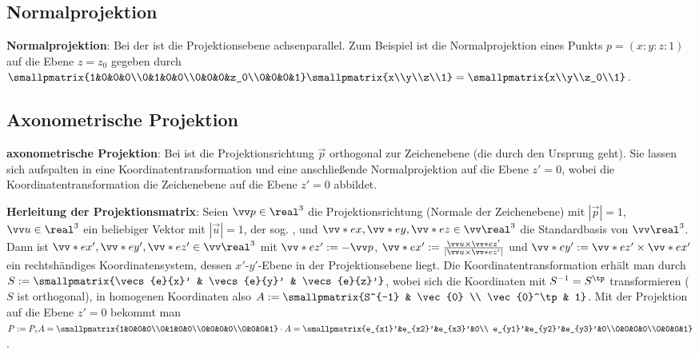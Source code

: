 \subsection{%
    Normalprojektion%
}

\textbf{Normalprojektion}:
Bei der  ist die Projektionsebene achsenparallel.
Zum Beispiel ist die Normalprojektion eines Punkts $p = (x:y:z:1)$ auf die Ebene $z = z_0$
gegeben durch
$\smallpmatrix{1&0&0&0\\0&1&0&0\\0&0&0&z_0\\0&0&0&1} \smallpmatrix{x\\y\\z\\1} =
\smallpmatrix{x\\y\\z_0\\1}$.

\subsection{%
    Axonometrische Projektion%
}

\textbf{axonometrische Projektion}:
Bei  ist die Projektionsrichtung $\vec{p}$ orthogonal
zur Zeichenebene (die durch den Ursprung geht).
Sie lassen sich aufspalten in eine Koordinatentransformation und eine anschließende
Normalprojektion auf die Ebene $z' = 0$,
wobei die Koordinatentransformation die Zeichenebene auf die Ebene $z' = 0$ abbildet.

\textbf{Herleitung der Projektionsmatrix}:
Seien $\vec{p} \in \real^3$ die Projektionsrichtung (Normale der Zeichenebene) mit $|\vec{p}| = 1$,
$\vec{u} \in \real^3$ ein beliebiger Vektor mit $|\vec{u}| = 1$, der sog. ,
und $\vecs{e}{x}, \vecs{e}{y}, \vecs{e}{z} \in \vec{\real}^3$ die Standardbasis von
$\vec{\real}^3$.
Dann ist $\vecs{e}{x}', \vecs{e}{y}', \vecs{e}{z}' \in \vec{\real}^3$
mit $\vecs{e}{z}' := -\vec{p}$,
$\vecs{e}{x}' := \frac{\vec{u} \times \vecs{e}{z}'}{|\vec{u} \times \vecs{e}{z}'|}$ und
$\vecs{e}{y}' := \vecs{e}{z}' \times \vecs{e}{x}'$
ein rechtshändiges Koordinatensystem, dessen $x'$-$y'$-Ebene in der Projektionsebene liegt.
Die Koordinatentransformation erhält man durch
$S := \smallpmatrix{\vecs{e}{x}' & \vecs{e}{y}' & \vecs{e}{z}'}$,
wobei sich die Koordinaten mit $S^{-1} = S^\tp$ transformieren ($S$ ist orthogonal),
in homogenen Koordinaten also $A := \smallpmatrix{S^{-1} & \vec{0} \\ \vec{0}^\tp & 1}$.
Mit der Projektion auf die Ebene $z' = 0$ bekommt man
$P := P_z A = \smallpmatrix{1&0&0&0\\0&1&0&0\\0&0&0&0\\0&0&0&1} \cdot A
= \smallpmatrix{e_{x1}'&e_{x2}'&e_{x3}'&0\\
e_{y1}'&e_{y2}'&e_{y3}'&0\\0&0&0&0\\0&0&0&1}$.

